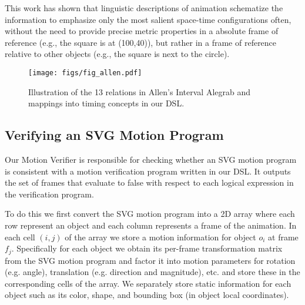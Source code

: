 %

%
This work has shown that linguistic descriptions of animation schematize the information to emphasize only the most salient space-time configurations often, without the need to provide precise metric properties in a absolute frame of reference (e.g., the square is at (100,40)), but rather in a frame of reference relative to other objects (e.g., the square is next to the circle).
%


\begin{figure*}[t]
  \centering
  \texttt{[image: figs/fig\_allen.pdf]}
  \caption{
      Illustration of the 13 relations in Allen's Interval Alegrab and mappings into 
      timing concepts in our DSL. 
  }
  \label{fig:allen}
\end{figure*}

\subsection{Verifying an SVG Motion Program}
\label{sec:verifier}

Our Motion Verifier is responsible for checking whether an SVG motion
program is consistent with a motion verification program written in our DSL.
%
%
It outputs the set of frames that evaluate to false with respect to
each logical expression in the verification program.
%


To do this we first convert the SVG motion program into a 2D array
where each row represent an object and each column
represents a frame of the animation. In each cell $(i,j)$ of the array
we store a motion information for object $o_i$ at
frame $f_j$.
%
%
Specifically for each object we obtain its per-frame transformation
matrix from the SVG motion program and factor it into motion parameters for
rotation (e.g. angle), translation (e.g. direction and magnitude),
etc. and store these in the corresponding cells of the array.
%
We separately store static information for each object such as its color,
shape, and bounding box (in object local coordinates).
%


